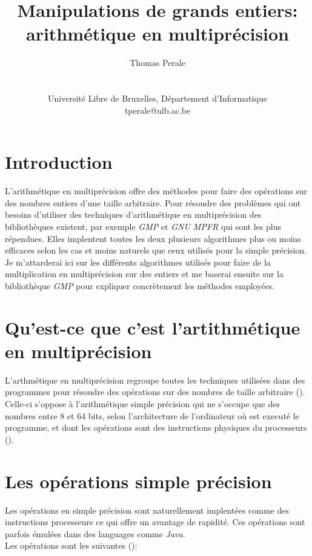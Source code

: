 \documentclass[letterpaper]{article}
\title{Manipulations de grands entiers: arithmétique en multiprécision}
\author{Thomas Perale\\
    \mbox{}\\\\
    Université Libre de Bruxelles, Département d'Informatique\\
    tperale@ulb.ac.be\\
}
\begin{document}
\maketitle

\section{Introduction}

L'arithmétique en multiprécision offre des méthodes pour faire des opérations
sur des nombres entiers d'une taille arbitraire. Pour résoudre des problèmes
qui ont besoins d'utiliser des techniques d'arithmétique en multiprécision des
bibliothèques existent, par exemple \emph{GMP} et \emph{GNU MPFR} qui sont les plus
répendues. Elles implentent toutes les deux plusieurs algorithmes plus ou moins
efficaces selon les cas et moins naturels que ceux utilisés pour la simple
précision.
Je m'attarderai ici sur les différents algorithmes utilisés pour faire de
la multiplication en multiprécision sur des entiers et me baserai ensuite sur
la bibliothèque \emph{GMP} pour expliquer concrètement les méthodes employées.

\section{Qu'est-ce que c'est l'artithmétique en multiprécision}

L'arthmétique en multiprécision regroupe toutes les techniques utilisées dans des
programmes pour résoudre des opérations sur des nombres de taille
arbitraire (\cite{wikimultiprecision}).
Celle-ci s'oppose à l'arithmétique simple précision qui ne s'occupe que des
nombres entre 8 et 64 bits, selon l'architecture de l'ordinateur où est executé
le programme, et dont les opérations sont des instructions physiques du
processeurs (\cite{wikimultiprecision}).

\section{Les opérations simple précision}

Les opérations en simple précision sont naturellement implentées comme des
instructions processeurs ce qui offre un avantage de rapidité. Ces opérations
sont parfois émulées dans des languages comme \emph{Java}.\\

Les opérations sont les suivantes (\cite{wikialu}):
\end{document}
